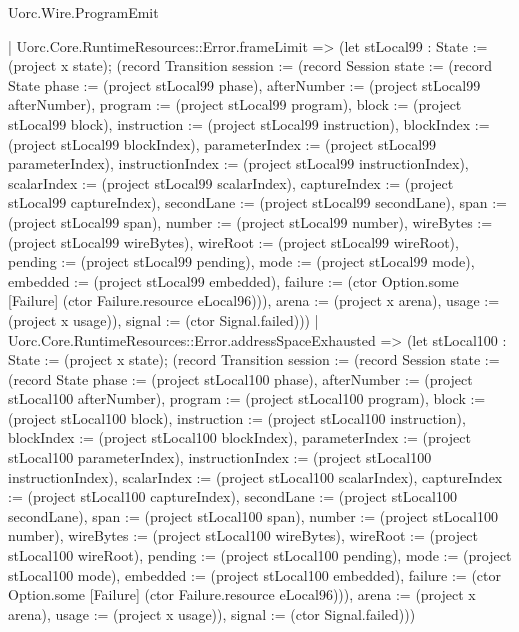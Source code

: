 \begin{lexlean}{Uorc.Wire.ProgramEmit}
\begin{semanticmodule}
{      | Uorc.Core.RuntimeResources::Error.frameLimit => (let stLocal99 : State := (project x state); (record Transition {session := (record Session {state := (record State {phase := (project stLocal99 phase), afterNumber := (project stLocal99 afterNumber), program := (project stLocal99 program), block := (project stLocal99 block), instruction := (project stLocal99 instruction), blockIndex := (project stLocal99 blockIndex), parameterIndex := (project stLocal99 parameterIndex), instructionIndex := (project stLocal99 instructionIndex), scalarIndex := (project stLocal99 scalarIndex), captureIndex := (project stLocal99 captureIndex), secondLane := (project stLocal99 secondLane), span := (project stLocal99 span), number := (project stLocal99 number), wireBytes := (project stLocal99 wireBytes), wireRoot := (project stLocal99 wireRoot), pending := (project stLocal99 pending), mode := (project stLocal99 mode), embedded := (project stLocal99 embedded), failure := (ctor Option.some [Failure] (ctor Failure.resource eLocal96))}), arena := (project x arena), usage := (project x usage)}), signal := (ctor Signal.failed)}))
      | Uorc.Core.RuntimeResources::Error.addressSpaceExhausted => (let stLocal100 : State := (project x state); (record Transition {session := (record Session {state := (record State {phase := (project stLocal100 phase), afterNumber := (project stLocal100 afterNumber), program := (project stLocal100 program), block := (project stLocal100 block), instruction := (project stLocal100 instruction), blockIndex := (project stLocal100 blockIndex), parameterIndex := (project stLocal100 parameterIndex), instructionIndex := (project stLocal100 instructionIndex), scalarIndex := (project stLocal100 scalarIndex), captureIndex := (project stLocal100 captureIndex), secondLane := (project stLocal100 secondLane), span := (project stLocal100 span), number := (project stLocal100 number), wireBytes := (project stLocal100 wireBytes), wireRoot := (project stLocal100 wireRoot), pending := (project stLocal100 pending), mode := (project stLocal100 mode), embedded := (project stLocal100 embedded), failure := (ctor Option.some [Failure] (ctor Failure.resource eLocal96))}), arena := (project x arena), usage := (project x usage)}), signal := (ctor Signal.failed)}))
}
\end{semanticmodule}
\end{lexlean}
